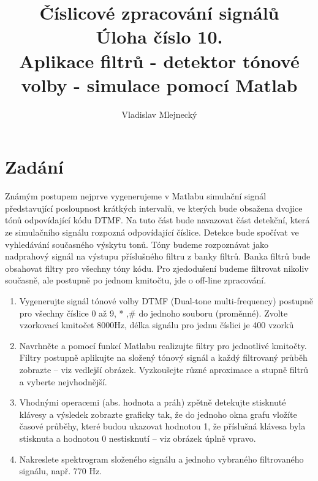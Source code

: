 \documentclass[11pt, a4paper]{article}
\author{Vladislav Mlejnecký}
\title{%
  Číslicové zpracování signálů\\
  \large Úloha číslo 10.\\
  Aplikace filtrů - detektor tónové volby - simulace pomocí Matlab}
\begin{document}
    \maketitle

    \section{Zadání}
    
        Známým postupem nejprve vygenerujeme v Matlabu simulační signál představující posloupnost krátkých
        intervalů, ve kterých bude obsažena dvojice tónů odpovídající kódu DTMF. Na tuto část bude navazovat část
        detekční, která ze simulačního signálu rozpozná odpovídající číslice. Detekce bude spočívat ve vyhledávání
        současného výskytu tonů. Tóny budeme rozpoznávat jako nadprahový signál na výstupu příslušného filtru
        z banky filtrů. Banka filtrů bude obsahovat filtry pro všechny tóny kódu. Pro zjedodušení budeme filtrovat
        nikoliv současně, ale postupně po jednom kmitočtu, jde o off-line zpracování.
        
        \begin{enumerate}
     
            \item
            Vygenerujte signál tónové volby DTMF (Dual-tone multi-frequency) 
            postupně pro všechny číslice 0 až 9, * ,\# do jednoho souboru 
            (proměnné). Zvolte vzorkovací kmitočet 8000Hz, délka signálu pro jednu 
            číslici je 400 vzorků

            \item
            Navrhněte a pomocí funkcí Matlabu realizujte filtry pro jednotlivé 
            kmitočty. Filtry postupně aplikujte na složený tónový signál a každý 
            filtrovaný průběh zobrazte – viz vedlejší obrázek. Vyzkoušejte různé 
            aproximace a stupně filtrů a vyberte nejvhodnější.

            \item
            Vhodnými operacemi (abs. hodnota a práh) zpětně detekujte stisknuté 
            klávesy a výsledek zobrazte graficky tak, že do jednoho okna grafu 
            vložíte časové průběhy, které budou ukazovat hodnotou 1, že příslušná 
            klávesa byla stisknuta a hodnotou 0 nestisknutí – viz obrázek úplně 
            vpravo.
        
            \item            
            Nakreslete spektrogram složeného signálu a jednoho 
            vybraného filtrovaného signálu, např. 770 Hz.
        
        \end{enumerate}
    
\end{document}
